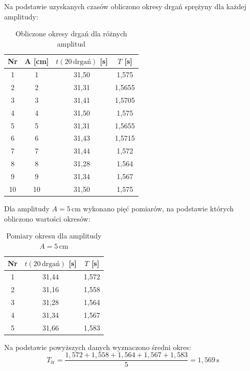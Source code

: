 \documentclass[a4paper,12pt]{article}
\begin{document}
Na podstawie uzyskanych czasów obliczono okresy drgań sprężyny dla każdej amplitudy:

\begin{table}[H]
    \centering
    \begin{tabular}{|c|c|c|c|}
        \hline
        Nr & A [cm] & $t(20\,\text{drgań})$ [s] & $T$ [s] \\
        \hline
        1  & 1  & 31{,}50 & 1{,}575 \\
        2  & 2  & 31{,}31 & 1{,}5655 \\
        3  & 3  & 31{,}41 & 1{,}5705 \\
        4  & 4  & 31{,}50 & 1{,}575 \\
        5  & 5  & 31{,}31 & 1{,}5655 \\
        6  & 6  & 31{,}43 & 1{,}5715 \\
        7  & 7  & 31{,}44 & 1{,}572 \\
        8  & 8  & 31{,}28 & 1{,}564 \\
        9  & 9  & 31{,}34 & 1{,}567 \\
        10 & 10 & 31{,}50 & 1{,}575 \\
        \hline
    \end{tabular}
    \caption{Obliczone okresy drgań dla różnych amplitud}
\end{table}

Dla amplitudy $A = 5\,\text{cm}$ wykonano pięć pomiarów, na podstawie których obliczono wartości okresów:

\begin{table}[H]
    \centering
    \begin{tabular}{|c|c|c|}
        \hline
        Nr & $t(20\,\text{drgań})$ [s] & $T$ [s] \\
        \hline
        1 & 31{,}44 & 1{,}572 \\
        2 & 31{,}16 & 1{,}558 \\
        3 & 31{,}28 & 1{,}564 \\
        4 & 31{,}34 & 1{,}567 \\
        5 & 31{,}66 & 1{,}583 \\
        \hline
    \end{tabular}
    \caption{Pomiary okresu dla amplitudy $A = 5\,\text{cm}$}
\end{table}

Na podstawie powyższych danych wyznaczono średni okres:
\[
    T_{\text{śr}} = \frac{1{,}572 + 1{,}558 + 1{,}564 + 1{,}567 + 1{,}583}{5} = 1{,}569\,\text{s}
\]
\end{document}
